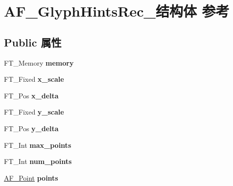 \hypertarget{struct_a_f___glyph_hints_rec__}{}\section{A\+F\+\_\+\+Glyph\+Hints\+Rec\+\_\+结构体 参考}
\label{struct_a_f___glyph_hints_rec__}
\subsection*{Public 属性}
\begin{DoxyCompactItemize}
\item 
\mbox{\label{struct_a_f___glyph_hints_rec___a1f7353d9cd7c324d9c60a40233c5705b}} 
F\+T\+\_\+\+Memory {\bfseries memory}
\item 
\mbox{\label{struct_a_f___glyph_hints_rec___af31b148e7250e634571f9ebe5b041f48}} 
F\+T\+\_\+\+Fixed {\bfseries x\+\_\+scale}
\item 
\mbox{\label{struct_a_f___glyph_hints_rec___adfffd305a43f0014279d434bebcec2e9}} 
F\+T\+\_\+\+Pos {\bfseries x\+\_\+delta}
\item 
\mbox{\label{struct_a_f___glyph_hints_rec___a7cf24284c694b4fd858ab2f726adc79b}} 
F\+T\+\_\+\+Fixed {\bfseries y\+\_\+scale}
\item 
\mbox{\label{struct_a_f___glyph_hints_rec___a4f53f29688ebc335e66cdd97e6173462}} 
F\+T\+\_\+\+Pos {\bfseries y\+\_\+delta}
\item 
\mbox{\label{struct_a_f___glyph_hints_rec___abc37a4dc856dc530fd8dc59bacc2e25d}} 
F\+T\+\_\+\+Int {\bfseries max\+\_\+points}
\item 
\mbox{\label{struct_a_f___glyph_hints_rec___a24c61c1254ffeaf1d2da793a1e850da1}} 
F\+T\+\_\+\+Int {\bfseries num\+\_\+points}
\item 
\mbox{\label{struct_a_f___glyph_hints_rec___ad4b6bbe17871f9c1e1d505a19a284d92}} 
\hyperlink{struct_a_f___point_rec__}{A\+F\+\_\+\+Point} {\bfseries points}

\end{DoxyCompactItemize}
